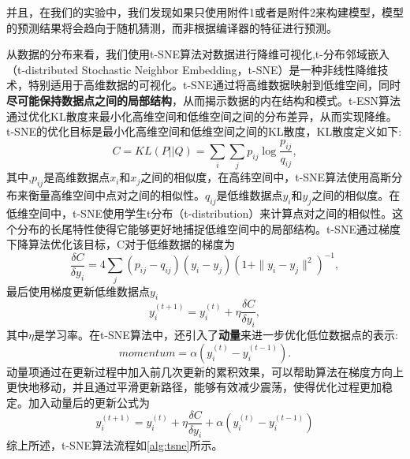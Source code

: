 并且，在我们的实验中，我们发现如果只使用附件1或者是附件2来构建模型，模型的预测结果将会趋向于随机猜测，而非根据编译器的特征进行预测。
\par
从数据的分布来看，我们使用t-SNE算法对数据进行降维可视化,t-分布邻域嵌入（t-distributed Stochastic Neighbor Embedding，t-SNE）\cite{JMLR:v9:vandermaaten08a}是一种非线性降维技术，特别适用于高维数据的可视化。t-SNE通过将高维数据映射到低维空间，同时\textbf{尽可能保持数据点之间的局部结构}，从而揭示数据的内在结构和模式。t-ESN算法通过优化KL散度来最小化高维空间和低维空间之间的分布差异，从而实现降维。t-SNE的优化目标是最小化高维空间和低维空间之间的KL散度，KL散度定义如下:
\begin{equation}
	C=KL(P||Q)=\sum_i\sum_jp_{ij}\log\frac{p_{ij}}{q_{ij}},
\end{equation}
其中,$p_{ij}$是高维数据点$x_i$和$x_j$之间的相似度，在高纬空间中，t-SNE算法使用高斯分布来衡量高维空间中点对之间的相似性。$q_{ij}$是低维数据点$y_i$和$y_j$之间的相似度。在低维空间中，t-SNE使用学生t分布（t-distribution）来计算点对之间的相似性。这个分布的长尾特性使得它能够更好地捕捉低维空间中的局部结构。t-SNE通过梯度下降算法优化该目标，C对于低维数据的梯度为
\begin{equation}
	\frac{\delta C}{\delta y_i}=4\sum_j(p_{ij}-q_{ij})(y_i-y_j)\left(1+\|y_i-y_j\|^2\right)^{-1},
\end{equation}
最后使用梯度更新低维数据点$y_i$
\begin{equation}
	y_i^{(t+1)}=y_i^{(t)}+\eta\frac{\delta C}{\delta y_i},
\end{equation}
其中$\eta$是学习率。在t-SNE算法中，还引入了\textbf{动量}来进一步优化低位数据点的表示:
\begin{equation}
	momentum=\alpha(y_i^{(t)}-y_i^{(t-1)}).
\end{equation}
动量项通过在更新过程中加入前几次更新的累积效果，可以帮助算法在梯度方向上更快地移动，并且通过平滑更新路径，能够有效减少震荡，使得优化过程更加稳定。加入动量后的更新公式为
\begin{equation}
	y_i^{(t+1)}=y_i^{(t)}+\eta\frac{\delta C}{\delta y_i}+\alpha(y_i^{(t)}-y_i^{(t-1)})
\end{equation}
综上所述，t-SNE算法流程如\autoref{alg:tsne}所示。
